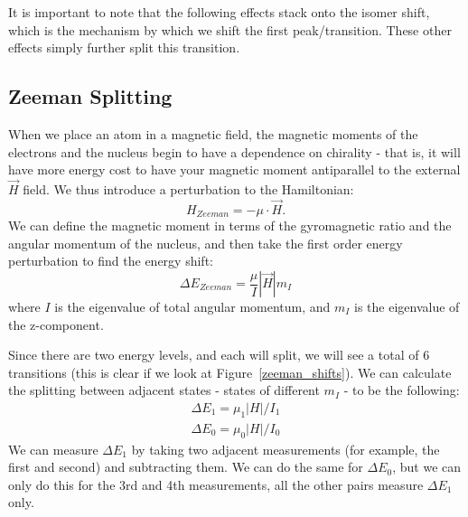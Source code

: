\documentclass[reprint, nobibnotes, amssymb, amsmath, amsfonts, mathtools, mathrsfs, floatfix]{revtex4-1}
\begin{document}
      It is important to note that the following effects stack onto the isomer shift, which is the mechanism by which we shift the first peak/transition.  These other effects simply further split this transition.

      \subsection{Zeeman Splitting}
        When we place an atom in a magnetic field, the magnetic moments of the electrons and the nucleus begin to have a dependence on chirality - that is, it will have more energy cost to have your magnetic moment antiparallel to the external $\vec{H}$ field.  We thus introduce a perturbation to the Hamiltonian:
        \begin{equation}
          H_{Zeeman} = -\mu \cdot \vec{H}.
        \end{equation}
        We can define the magnetic moment in terms of the gyromagnetic ratio and the angular momentum of the nucleus, and then take the first order energy perturbation to find the energy shift:
        \begin{equation}
          \Delta E_{Zeeman} = \frac{\mu}{I}|\vec{H}|m_{I}
        \end{equation}
        where $I$ is the eigenvalue of total angular momentum, and $m_I$ is the eigenvalue of the z-component.

        Since there are two energy levels, and each will split, we will see a total of 6 transitions (this is clear if we look at Figure~\ref{zeeman_shifts}).  We can calculate the splitting between adjacent states - states of different $m_I$ - to be the following:
        \begin{gather}
          \Delta E_1 = \mu_1|H|/I_1 \label{E1_zeeman_shift} \\
          \Delta E_0 = \mu_0|H|/I_0 \label{E2_zeeman_shift}
        \end{gather}
        We can measure $\Delta E_{1}$ by taking two adjacent measurements (for example, the first and second) and subtracting them.  We can do the same for $\Delta E_{0}$, but we can only do this for the 3rd and 4th measurements, all the other pairs measure $\Delta E_1$ only.
\end{document}
